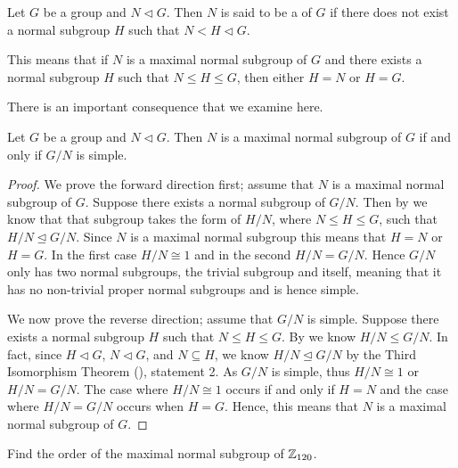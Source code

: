 \begin{definition}
    Let $G$ be a group and $N \lhd G$. Then $N$ is said to be a  of $G$ if there does not exist a normal subgroup $H$ such that $N < H \lhd G$.
\end{definition}
\begin{remark}
    This means that if $N$ is a maximal normal subgroup of $G$ and there exists a normal subgroup $H$ such that $N \leq H \leq G$, then either $H = N$ or $H = G$.
\end{remark}

There is an important consequence that we examine here.
\begin{theorem}\label{thrm-maximal-normal-subgroup-iff-quotient-is-simple}
    Let $G$ be a group and $N \lhd G$. Then $N$ is a maximal normal subgroup of $G$ if and only if $G/N$ is simple.
\end{theorem}

\begin{proof}
    We prove the forward direction first; assume that $N$ is a maximal normal subgroup of $G$. Suppose there exists a normal subgroup of $G/N$. Then by  we know that that subgroup takes the form of $H/N$, where $N \leq H \leq G$, such that $H/N \unlhd G/N$. Since $N$ is a maximal normal subgroup this means that $H = N$ or $H = G$. In the first case $H/N \cong 1$ and in the second $H / N = G/N$. Hence $G/N$ only has two normal subgroups, the trivial subgroup and itself, meaning that it has no non-trivial proper normal subgroups and is hence simple.

    We now prove the reverse direction; assume that $G/N$ is simple. Suppose there exists a normal subgroup $H$ such that $N \leq H \leq G$. By  we know $H/N \leq G/N$. In fact, since $H \lhd G$, $N \lhd G$, and $N \subseteq H$, we know $H/N \unlhd G/N$ by the Third Isomorphism Theorem (), statement 2. As $G/N$ is simple, thus $H/N \cong 1$ or $H/N = G/N$. The case where $H/N \cong 1$ occurs if and only if $H = N$ and the case where $H/N = G/N$ occurs when $H = G$. Hence, this means that $N$ is a maximal normal subgroup of $G$.
\end{proof}

\begin{exercise}
    Find the order of the maximal normal subgroup of $\mathbb{Z}_{120}$.
\end{exercise}

